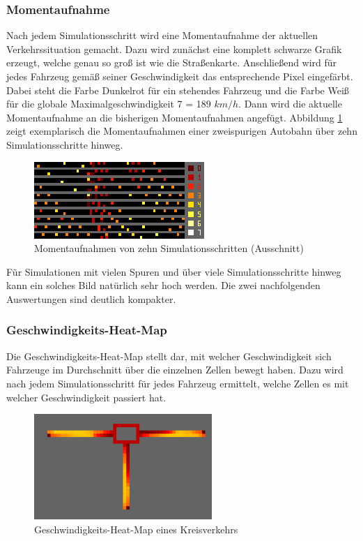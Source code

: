\documentclass[10pt, a4paper]{article}
\begin{document}
\subsubsection{Momentaufnahme}
\label{subsubsec:momentaufnahme}

Nach jedem Simulationsschritt wird eine Momentaufnahme der aktuellen Verkehrssituation gemacht. Dazu wird zunächst eine komplett schwarze Grafik erzeugt, welche genau so groß ist wie die Straßenkarte. Anschließend wird für jedes Fahrzeug gemäß seiner Geschwindigkeit das entsprechende Pixel eingefärbt. Dabei steht die Farbe Dunkelrot für ein stehendes Fahrzeug und die Farbe Weiß für die globale Maximalgeschwindigkeit 7 = 189 $km/h$. Dann wird die aktuelle Momentaufnahme an die bisherigen Momentaufnahmen angefügt. Abbildung \ref{fig:momentaufnameMultilane} zeigt exemplarisch die Momentaufnahmen einer zweispurigen Autobahn über zehn Simulationsschritte hinweg.

\begin{figure}[h!]
	\centering
	\includegraphics[height=2.91cm]{img/vis_multilane_2_lanes}
	\caption{Momentaufnahmen von zehn Simulationsschritten (Ausschnitt)}
	\label{fig:momentaufnameMultilane}
\end{figure}

Für Simulationen mit vielen Spuren und über viele Simulationsschritte hinweg kann ein solches Bild natürlich sehr hoch werden. Die zwei nachfolgenden Auswertungen sind deutlich kompakter.

\subsubsection{Geschwindigkeits-Heat-Map}
\label{subsubsec:speedmap}

Die Geschwindigkeits-Heat-Map stellt dar, mit welcher Geschwindigkeit sich Fahrzeuge im Durchschnitt über die einzelnen Zellen bewegt haben. Dazu wird nach jedem Simulationsschritt für jedes Fahrzeug ermittelt, welche Zellen es mit welcher Geschwindigkeit passiert hat.

\begin{figure}[h!]
	\centering
	\includegraphics[height=4cm]{img/vis_roundabout_speed_heat_map}
	\caption{Geschwindigkeits-Heat-Map eines Kreisverkehrs}
	\label{fig:speedMapRoundabout}
\end{figure}
\end{document}
